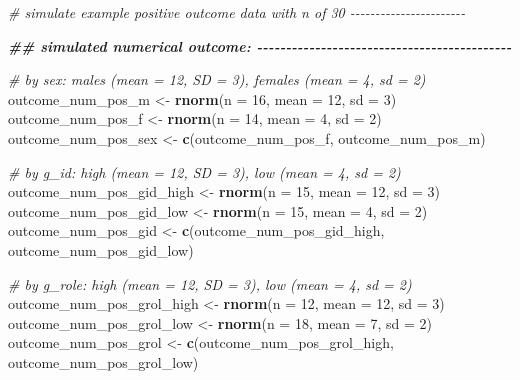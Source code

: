 \documentclass[
]{book}
\newenvironment{Shaded}{\begin{snugshade}}{\end{snugshade}}
\newcommand{\AttributeTok}[1]{\textcolor[rgb]{0.13,0.29,0.53}{#1}}
\newcommand{\CommentTok}[1]{\textcolor[rgb]{0.56,0.35,0.01}{\textit{#1}}}
\newcommand{\DecValTok}[1]{\textcolor[rgb]{0.00,0.00,0.81}{#1}}
\newcommand{\DocumentationTok}[1]{\textcolor[rgb]{0.56,0.35,0.01}{\textbf{\textit{#1}}}}
\newcommand{\FunctionTok}[1]{\textcolor[rgb]{0.13,0.29,0.53}{\textbf{#1}}}
\newcommand{\NormalTok}[1]{#1}
\newcommand{\OtherTok}[1]{\textcolor[rgb]{0.56,0.35,0.01}{#1}}
\begin{document}
\begin{Shaded}
\begin{Highlighting}[]
\CommentTok{\# simulate example positive outcome data with n of 30 {-}{-}{-}{-}{-}{-}{-}{-}{-}{-}{-}{-}{-}{-}{-}{-}{-}{-}{-}{-}{-}{-}{-}}

\DocumentationTok{\#\# simulated numerical outcome: {-}{-}{-}{-}{-}{-}{-}{-}{-}{-}{-}{-}{-}{-}{-}{-}{-}{-}{-}{-}{-}{-}{-}{-}{-}{-}{-}{-}{-}{-}{-}{-}{-}{-}{-}{-}{-}{-}{-}{-}{-}{-}{-}{-}}

\CommentTok{\# by sex: males (mean = 12, SD = 3), females (mean = 4, sd = 2)}
\NormalTok{outcome\_num\_pos\_m }\OtherTok{\textless{}{-}} \FunctionTok{rnorm}\NormalTok{(}\AttributeTok{n =} \DecValTok{16}\NormalTok{, }\AttributeTok{mean =} \DecValTok{12}\NormalTok{, }\AttributeTok{sd =} \DecValTok{3}\NormalTok{)}
\NormalTok{outcome\_num\_pos\_f }\OtherTok{\textless{}{-}} \FunctionTok{rnorm}\NormalTok{(}\AttributeTok{n =} \DecValTok{14}\NormalTok{, }\AttributeTok{mean =} \DecValTok{4}\NormalTok{, }\AttributeTok{sd =} \DecValTok{2}\NormalTok{)}
\NormalTok{outcome\_num\_pos\_sex }\OtherTok{\textless{}{-}} \FunctionTok{c}\NormalTok{(outcome\_num\_pos\_f, outcome\_num\_pos\_m)}

\CommentTok{\# by g\_id: high (mean = 12, SD = 3), low (mean = 4, sd = 2)}
\NormalTok{outcome\_num\_pos\_gid\_high }\OtherTok{\textless{}{-}} \FunctionTok{rnorm}\NormalTok{(}\AttributeTok{n =} \DecValTok{15}\NormalTok{, }\AttributeTok{mean =} \DecValTok{12}\NormalTok{, }\AttributeTok{sd =} \DecValTok{3}\NormalTok{)}
\NormalTok{outcome\_num\_pos\_gid\_low }\OtherTok{\textless{}{-}} \FunctionTok{rnorm}\NormalTok{(}\AttributeTok{n =} \DecValTok{15}\NormalTok{, }\AttributeTok{mean =} \DecValTok{4}\NormalTok{, }\AttributeTok{sd =} \DecValTok{2}\NormalTok{)}
\NormalTok{outcome\_num\_pos\_gid }\OtherTok{\textless{}{-}} \FunctionTok{c}\NormalTok{(outcome\_num\_pos\_gid\_high, outcome\_num\_pos\_gid\_low)}

\CommentTok{\# by g\_role: high (mean = 12, SD = 3), low (mean = 4, sd = 2)}
\NormalTok{outcome\_num\_pos\_grol\_high }\OtherTok{\textless{}{-}} \FunctionTok{rnorm}\NormalTok{(}\AttributeTok{n =} \DecValTok{12}\NormalTok{, }\AttributeTok{mean =} \DecValTok{12}\NormalTok{, }\AttributeTok{sd =} \DecValTok{3}\NormalTok{)}
\NormalTok{outcome\_num\_pos\_grol\_low }\OtherTok{\textless{}{-}} \FunctionTok{rnorm}\NormalTok{(}\AttributeTok{n =} \DecValTok{18}\NormalTok{, }\AttributeTok{mean =} \DecValTok{7}\NormalTok{, }\AttributeTok{sd =} \DecValTok{2}\NormalTok{)}
\NormalTok{outcome\_num\_pos\_grol }\OtherTok{\textless{}{-}} \FunctionTok{c}\NormalTok{(outcome\_num\_pos\_grol\_high, outcome\_num\_pos\_grol\_low)}



\end{Highlighting}
\end{Shaded}
\end{document}
